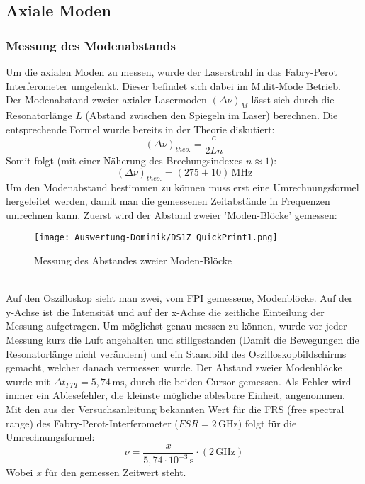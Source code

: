 \subsection{Axiale Moden}
\subsubsection{Messung des Modenabstands}
Um die axialen Moden zu messen, wurde der Laserstrahl in das Fabry-Perot Interferometer umgelenkt.
Dieser befindet sich dabei im Mulit-Mode Betrieb.\\
Der Modenabstand zweier axialer Lasermoden $\left(\Delta\nu\right)_M$ lässt sich durch die Resonatorlänge $L$ (Abstand zwischen den Spiegeln im Laser) berechnen.
Die entsprechende Formel wurde bereits in der Theorie diskutiert:
\begin{equation}
    \left(\Delta\nu\right)_{theo.}=\frac{c}{2Ln}
\end{equation}
Somit folgt (mit einer Näherung des Brechungsindexes $n \approx 1$): %
\begin{equation}
    \left(\Delta\nu\right)_{theo.} = \left(275\pm10\right)\,\text{MHz}
\end{equation}
Um den Modenabstand bestimmen zu können muss erst eine Umrechnungsformel hergeleitet werden, damit man die gemessenen Zeitabstände in Frequenzen umrechnen kann.
Zuerst wird der Abstand zweier 'Moden-Blöcke' gemessen:
\begin{figure}[h]
    \centering\texttt{[image: Auswertung-Dominik/DS1Z\_QuickPrint1.png]}
    \caption{Messung des Abstandes zweier Moden-Blöcke}
\end{figure}\\
Auf den Oszilloskop sieht man zwei, vom FPI gemessene, Modenblöcke.
Auf der y-Achse ist die Intensität und auf der x-Achse die zeitliche Einteilung der Messung aufgetragen.
Um möglichst genau messen zu können, wurde vor jeder Messung kurz die Luft angehalten und stillgestanden (Damit die Bewegungen die Resonatorlänge nicht verändern) und ein Standbild des Oszilloskopbildschirms gemacht, welcher danach vermessen wurde.
Der Abstand zweier Modenblöcke wurde mit $\Delta t_{FPI}=5,74\,\text{ms}$, durch die beiden Cursor gemessen.
Als Fehler wird immer ein Ablesefehler, die kleinste mögliche ablesbare Einheit, angenommen.
Mit den aus der Versuchsanleitung bekannten Wert für die FRS (free spectral range) des Fabry-Perot-Interferometer ($FSR=2\,\text{GHz}$) folgt für die Umrechnungsformel:
\begin{equation}
    \nu=\frac{x}{5,74\cdot10^{-3}\,\text{s}}\cdot\left(2\,\text{GHz}\right)
\end{equation}
Wobei $x$ für den gemessen Zeitwert steht.\\

